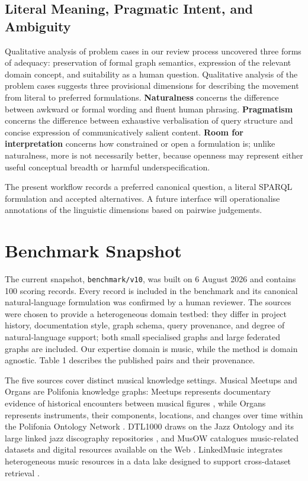 \subsection{Literal Meaning, Pragmatic Intent, and Ambiguity}\label{literal-meaning-pragmatic-intent-and-ambiguity}

Qualitative analysis of problem cases in our review process uncovered three forms of adequacy: preservation of formal graph semantics, expression of the relevant domain concept, and suitability as a human question. Qualitative analysis of the problem cases suggests three provisional dimensions for describing the movement from literal to preferred formulations. \textbf{Naturalness} concerns the difference between awkward or formal wording and fluent human phrasing. \textbf{Pragmatism} concerns the difference between exhaustive verbalisation of query structure and concise expression of communicatively salient content. \textbf{Room for interpretation} concerns how constrained or open a formulation is; unlike naturalness, more is not necessarily better, because openness may represent either useful conceptual breadth or harmful underspecification.

The present workflow records a preferred canonical question, a literal SPARQL formulation and accepted alternatives. A future interface will operationalise annotations of the linguistic dimensions based on pairwise judgements.

\section{Benchmark Snapshot}\label{benchmark-snapshot}

The current snapshot, \texttt{benchmark/v10}, was built on 6 August 2026 and contains 100 scoring records. Every record is included in the benchmark and its canonical natural-language formulation was confirmed by a human reviewer. The sources were chosen to provide a heterogeneous domain testbed: they differ in project history, documentation style, graph schema, query provenance, and degree of natural-language support; both small specialised graphs and large federated graphs are included. Our expertise domain is music, while the method is domain agnostic. Table 1 describes the published pairs and their provenance.

The five sources cover distinct musical knowledge settings. Musical Meetups and Organs are Polifonia knowledge graphs: Meetups represents documentary evidence of historical encounters between musical figures \citep{morales2024mmkg}, while Organs represents instruments, their components, locations, and changes over time within the Polifonia Ontology Network \citep{deberardinis2023polifonia}. DTL1000 draws on the Jazz Ontology and its large linked jazz discography repositories \citep{proutskova2022jazz}, and MusOW catalogues music-related datasets and digital resources available on the Web \citep{daquino2017musical}. LinkedMusic integrates heterogeneous music resources in a data lake designed to support cross-dataset retrieval \citep{pond2025sesemmi}.

